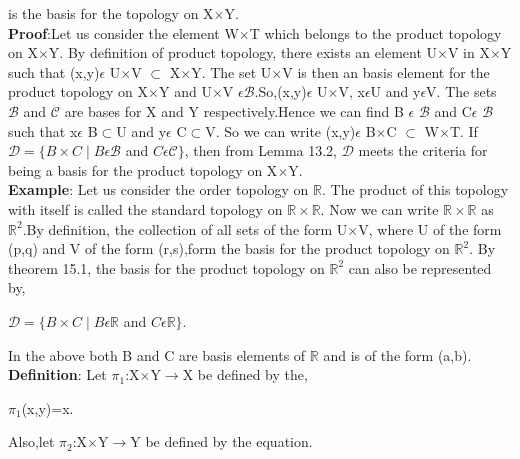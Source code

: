 \documentclass[a4paper,english,12pt]{article}
\begin{document}
\begin{defn}
\begin{center}
\end{center}
\vspace{1mm}
is the basis for the topology on X$\times$Y.\\
{\bf Proof}:Let us consider the element W$\times$T which belongs to the product topology on X$\times$Y. By definition of product topology, there exists an element U$\times$V in X$\times$Y such that (x,y)$\epsilon$ U$\times$V $\subset$ X$\times$Y. The set U$\times$V is then an basis element for the product topology on X$\times$Y and U$\times$V $\epsilon \mathscr{B}$.So,(x,y)$\epsilon$ U$\times$V, x$\epsilon$U and y$\epsilon$V. The sets $\mathscr{B}$ and $\mathscr{C}$ are bases for X and Y respectively.Hence we can find B $\epsilon$ $\mathscr{B}$ and C$\epsilon$ $\mathscr{B}$ such that x$\epsilon$ B$\subset$U and y$\epsilon$ C$\subset$V. So we can write (x,y)$\epsilon$ B$\times$C $\subset$ W$\times$T. If $\mathscr{D}=\{B\times C\mid B \epsilon \mathscr{B}$ and $C \epsilon \mathscr{C}\}$, then from Lemma 13.2, $\mathscr{D}$ meets the criteria for being a basis for the product topology on X$\times$Y.\\
\vspace{1mm}
{\bf Example}: Let us consider the order topology on $\mathbb{R}$. The product of this topology with itself is called the standard topology on $\mathbb{R}\times\mathbb{R}$. Now we can write $\mathbb{R}\times\mathbb{R}$ as $\mathbb{R}^2$.By definition, the collection of all sets of the form U$\times$V, where U  of the form (p,q) and V of the form (r,s),form the basis for the product topology on $\mathbb{R}^2$. By theorem 15.1, the basis for the product topology on $\mathbb{R}^2$ can also be represented by,\\
\begin{center}
$\mathscr{D}=\{B\times C\mid B \epsilon \mathbb{R}$ and $C \epsilon \mathbb{R}\}$.\\
\end{center}
In the above  both B and C are basis elements of $\mathbb{R}$ and is of the form (a,b).\\
\vspace{1mm}
{\bf Definition}: Let $\pi_1$:X$\times$Y$\rightarrow$X be defined by the,\\
\begin{center}
$\pi_1$(x,y)=x. \\
\end{center}
Also,let $\pi_2$:X$\times$Y$\rightarrow$Y be defined by the equation.\\
\begin{center}

\end{center}
\end{defn}
\end{document}

